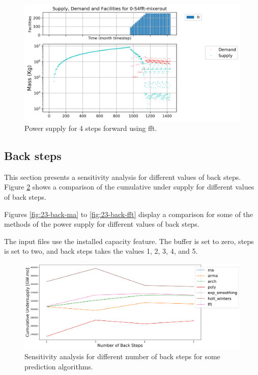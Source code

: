 \documentclass[11pt]{article}
\begin{document}
\begin{figure}[!h]
	\centering
	\includegraphics[width=\textwidth]{23-figures/0-S4-fft-mixerout.png} 
	\hfill
	\caption{Power supply for 4 steps forward using fft.}
	\label{fig:23-ste-fft-mixerout}
\end{figure}

\subsection{Back steps}

This section presents a sensitivity analysis for different values of  back steps. Figure \ref{fig:23-backs} shows a comparison of the cumulative under supply for different values of back steps.

Figures \ref{fig:23-back-ma} to \ref{fig:23-back-fft} display a comparison for some of the methods of the power supply for different values of back steps.

The input files use the installed capacity feature. The buffer is set to zero, steps is set to two, and back steps takes the values 1, 2, 3, 4, and 5.

\begin{figure}[!h]
	\centering
	\includegraphics[width=\textwidth]{23-figures/23-sens-backs.png} 
	\hfill
	\caption{Sensitivity analysis for different number of back steps for some prediction algorithms.}
	\label{fig:23-backs}
\end{figure}
\end{document}
